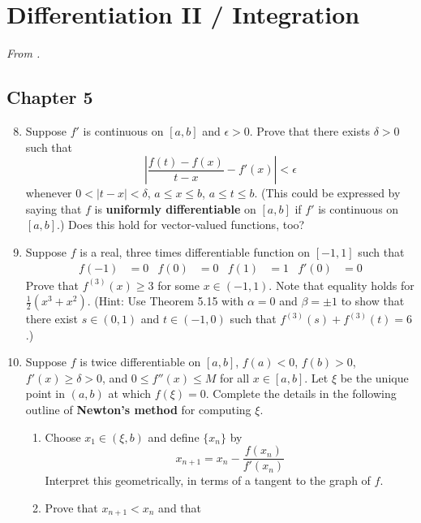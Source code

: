 \documentclass[../psets.tex]{subfiles}
\begin{document}
\section{Differentiation II / Integration}
\emph{From \textcite{bib:Rudin}.}
\subsection*{Chapter 5}
\begin{enumerate}[label={\textbf{\arabic*.}}]
    \setcounter{enumi}{7}
    \item Suppose $f'$ is continuous on $[a,b]$ and $\epsilon>0$. Prove that there exists $\delta>0$ such that
    \begin{equation*}
        \left| \frac{f(t)-f(x)}{t-x}-f'(x) \right| < \epsilon
    \end{equation*}
    whenever $0<|t-x|<\delta$, $a\leq x\leq b$, $a\leq t\leq b$. (This could be expressed by saying that $f$ is \textbf{uniformly differentiable} on $[a,b]$ if $f'$ is continuous on $[a,b]$.) Does this hold for vector-valued functions, too?
    \setcounter{enumi}{16}
    \item Suppose $f$ is a real, three times differentiable function on $[-1,1]$ such that
    \begin{align*}
        f(-1) &= 0&
        f(0) &= 0&
        f(1) &= 1&
        f'(0) &= 0
    \end{align*}
    Prove that $f^{(3)}(x)\geq 3$ for some $x\in(-1,1)$. Note that equality holds for $\frac{1}{2}(x^3+x^2)$. (Hint: Use Theorem 5.15 with $\alpha=0$ and $\beta=\pm 1$ to show that there exist $s\in(0,1)$ and $t\in(-1,0)$ such that $f^{(3)}(s)+f^{(3)}(t)=6$.)
    \setcounter{enumi}{24}
    \item Suppose $f$ is twice differentiable on $[a,b]$, $f(a)<0$, $f(b)>0$, $f'(x)\geq\delta>0$, and $0\leq f''(x)\leq M$ for all $x\in[a,b]$. Let $\xi$ be the unique point in $(a,b)$ at which $f(\xi)=0$. Complete the details in the following outline of \textbf{Newton's method} for computing $\xi$.
    \begin{enumerate}
        \item Choose $x_1\in(\xi,b)$ and define $\{x_n\}$ by
        \begin{equation*}
            x_{n+1} = x_n-\frac{f(x_n)}{f'(x_n)}
        \end{equation*}
        Interpret this geometrically, in terms of a tangent to the graph of $f$.
        \item Prove that $x_{n+1}<x_n$ and that

\end{enumerate}
\end{enumerate}
\end{document}
